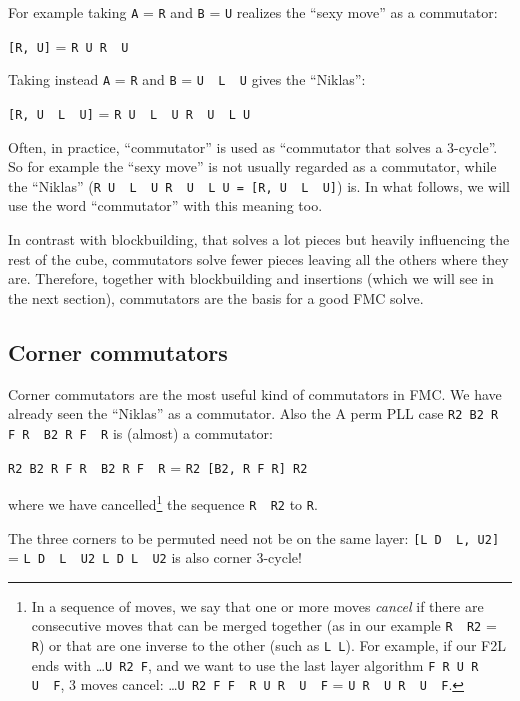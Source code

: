 \documentclass[11pt,a4paper]{book}
\newcommand{\p}{\textquotesingle}
\newcommand{\m}{\texttt}
\newcommand{\ps}{\p\,\,}
\begin{document}
For example taking \m{A} = \m{R} and \m{B} = \m{U} realizes the ``sexy move'' as a commutator:
\begin{center}
\m{[R, U]} = \m{R U R\ps U\p}
\end{center}

Taking instead \m A = \m R and \m B = \m{U\ps L\ps U} gives the ``Niklas'':

\begin{center}
\m{[R, U\ps L\ps U]} = \m{R U\ps L\ps U R\ps U\ps L U}
\end{center}

Often, in practice, ``commutator'' is used as ``commutator that solves a 3-cycle''. So for example the ``sexy move'' is not usually regarded as a commutator, while the ``Niklas'' (\m{R U\ps L\ps U R\ps U\ps L U = [R, U\ps L\ps U]}) is. In what follows, we will use the word ``commutator'' with this meaning too.

In contrast with blockbuilding, that solves a lot pieces but heavily influencing the rest of the cube, commutators solve fewer pieces leaving all the others where they are. Therefore, together with blockbuilding and insertions (which we will see in the next section), commutators are the basis for a good FMC solve.

\subsection{Corner commutators}

Corner commutators are the most useful kind of commutators in FMC. We have already seen the ``Niklas'' as a commutator. Also the A perm PLL case \m{R2 B2 R F R\ps B2 R F\ps R} is (almost) a commutator:

\begin{center}
\m{R2 B2 R F R\ps B2 R F\ps R} = \m{R2 [B2, R F R\p] R2}
\end{center}

where we have cancelled\footnote{In a sequence of moves, we say that one or more moves \emph{cancel} if there are consecutive moves that can be merged together (as in our example \m{R\ps R2} = \m R) or that are one inverse to the other (such as \m{L L\p}). For example, if our F2L ends with \dots\m{U R2 F\p}, and we want to use the last layer algorithm \m{F R U R\ps U\ps F\p}, 3 moves cancel:
\dots\m{U R2 F F\ps R U R\ps U\ps F\p} = \m{U R\ps U R\ps U\ps F\p}.} the sequence \m{R\ps R2} to \m R.

The three corners to be permuted need not be on the same layer: \m{[L D\ps L\p, U2]} = \m{L D\ps L\ps U2 L D L\ps U2} is also corner 3-cycle!
\end{document}

